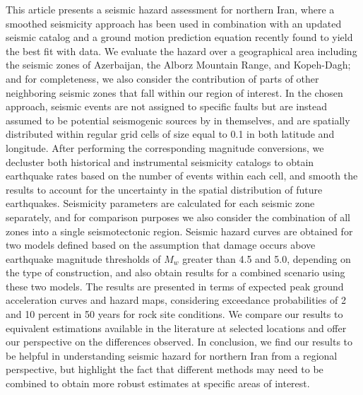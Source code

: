 % 
This article presents a seismic hazard assessment for northern Iran, where a smoothed seismicity approach has been used in combination with an updated seismic catalog and a ground motion prediction equation recently found to yield the best fit with data. We evaluate the hazard over a geographical area including the seismic zones of Azerbaijan, the Alborz Mountain Range, and Kopeh-Dagh; and for completeness, we also consider the contribution of parts of other neighboring seismic zones that fall within our region of interest.
In the chosen approach, seismic events are not assigned to specific faults but are instead assumed to be potential seismogenic sources by in themselves, and are spatially distributed within regular grid cells of size equal to 0.1\textdegree{} in both latitude and longitude. After performing the corresponding magnitude conversions, we decluster both historical and instrumental seismicity catalogs to obtain earthquake rates based on the number of events within each cell, and smooth the results to account for the uncertainty in the spatial distribution of future earthquakes. Seismicity parameters are calculated for each seismic zone separately, and for comparison purposes we also consider the combination of all zones into a single seismotectonic region. Seismic hazard curves are obtained for two 
models defined based on the assumption that damage occurs above earthquake magnitude thresholds of $M_w$ greater than 4.5 and 5.0, depending on the type of construction, 
and also obtain results for a combined scenario using these two models. The results are presented in terms of expected peak ground acceleration curves and hazard maps, considering exceedance probabilities of 2 and 10 percent in 50 years for rock site conditions. We compare our results to equivalent estimations available in the literature at selected locations and offer our perspective on the differences observed. In conclusion, we find our results to be helpful in understanding seismic hazard for northern Iran from a regional perspective, but highlight the fact that different methods may need to be combined to obtain more robust estimates at specific areas of interest.


